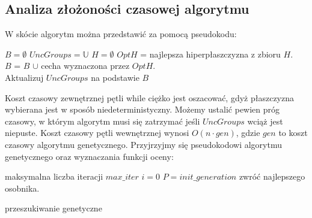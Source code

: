 \documentclass[magisterska]{pracamgr}
\theoremstyle{plain}
\theoremstyle{definition}
\theoremstyle{remark}
\begin{document}
\subsection{Analiza złożoności czasowej algorytmu}
W skócie algorytm można przedstawić za pomocą pseudokodu: \\

\begin{algorithm}[H]
  $ B = \emptyset$\;
  $ UncGroups = \mathbb{U}$\;
  $ H = \emptyset$\;
 $OptH$ = najlepsza hiperpłaszczyzna z zbioru $H$. \\
 $B$ = $B$ $\cup$ cecha wyznaczona przez $OptH$. \\
 Aktualizuj $UncGroups$ na podstawie $B$
\end{algorithm} 

Koszt czasowy zewnętrznej pętli while ciężko jest oszacować, gdyż płaszczyzna wybierana jest w sposób niedeterministyczny. Możemy ustalić pewien 
próg czasowy, w którym algorytm musi się zatrzymać jeśli $UncGroups$ wciąż jest niepuste. Koszt czasowy pętli wewnętrznej wynosi
$O(n \cdot gen)$, gdzie $gen$ to koszt czasowy algorytmu genetycznego. Przyjrzyjmy się pseudokodowi algorytmu genetycznego oraz
wyznaczania funkcji oceny: \\
\begin{algorithm}[H]
 {maksymalna liczba iteracji $max\_iter$}
  $ i = 0 $\;
  $ P = init\_generation $\;
 zwróć najlepszego osobnika. \
 \caption{przeszukiwanie genetyczne}
\end{algorithm}
\end{document}

